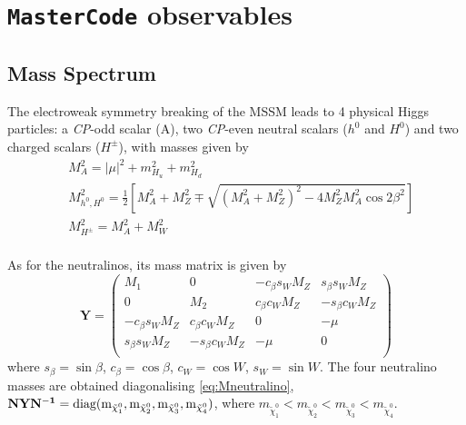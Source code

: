 \cleardoublepage
\chapter{\texttt{MasterCode} observables}\label{app:MCOBS}

\section{Mass Spectrum}
The electroweak symmetry breaking of the MSSM leads to 4 physical Higgs particles: a \textit{CP}-odd scalar (A), two \textit{CP}-even neutral scalars ($h^0$ and $H^0$) and two charged scalars ($H^{\pm}$), with masses given by 
\begin{equation}
\begin{split}
& M_A^2 = |\mu|^2 + m_{H_u}^2 + m_{H_d}^2 \\
& M_{h^0,H^0}^2 = \frac{1}{2}\left [ M_A^2 + M_Z^2 \mp \sqrt{(M_A^2 + M_Z^2)^2 - 4M_Z^2M_A^2\cos{2\beta}^2} \right ] \\
& M_{H^{\pm}}^2 = M_A^2 + M_W^2 \\
\end{split}
\end{equation}

As for the neutralinos, its mass matrix is given by
\begin{equation}
\mathbf{Y} = \left( \begin{matrix}
M_1 & 0 & -c_{\beta}s_WM_Z & s_{\beta}s_WM_Z \\ 
0 & M_2 & c_{\beta}c_WM_Z & -s_{\beta}c_WM_Z \\
-c_{\beta}s_WM_Z & c_{\beta}c_WM_Z & 0 & -\mu \\ 
s_{\beta}s_WM_Z & -s_{\beta}c_WM_Z & -\mu & 0 \\
\end{matrix}\right)
\label{eq:Mneutralino}
\end{equation}
where $s_{\beta} = \sin{\beta}$, $c_{\beta} = \cos{\beta}$, $c_W = \cos{W}$, $s_W = \sin{W}$. The four neutralino masses are obtained diagonalising \ref{eq:Mneutralino}, $\mathbf{NYN^{-1}} = \rm diag(m_{\tilde{\chi}_1^0},m_{\tilde{\chi}_2^0},m_{\tilde{\chi}_3^0},
m_{\tilde{\chi}_4^0})$, where $m_{\tilde{\chi}_1^0}<m_{\tilde{\chi}_2^0}<m_{\tilde{\chi}_3^0}<m_{\tilde{\chi}_4^0}$.

